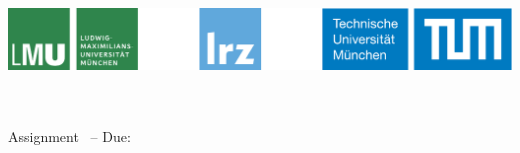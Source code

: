\noindent
\includegraphics[width=\textwidth]{template/header_logos.pdf}

\vspace{1cm}
\begin{center}
{\Large \lecture} \\
\bigskip
\people \\
\medskip
Assignment \assignment~-- Due: \due
\end{center}
\bigskip
